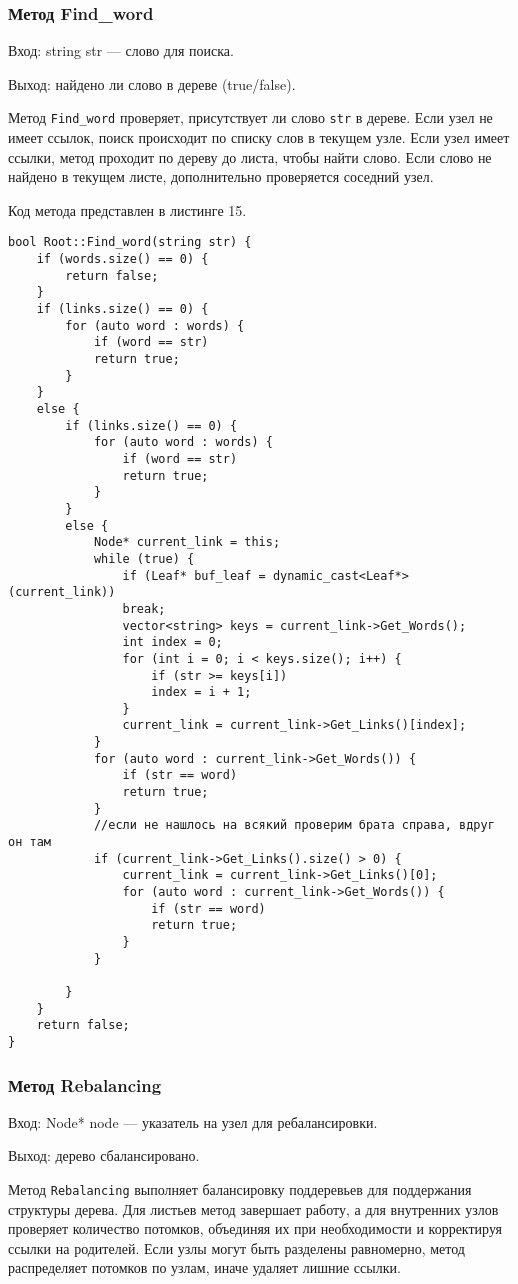 \documentclass[10pt,a4paper,final]{article} %
\begin{document}
\subsubsection{Метод Find\_word}
Вход: string str — слово для поиска. \par
Выход: найдено ли слово в дереве (true/false). \par
\par Метод \texttt{Find\_word} проверяет, присутствует ли слово \texttt{str} в дереве. Если узел не имеет ссылок, поиск происходит по списку слов в текущем узле. Если узел имеет ссылки, метод проходит по дереву до листа, чтобы найти слово. Если слово не найдено в текущем листе, дополнительно проверяется соседний узел.

Код метода представлен в листинге 15. \begin{lstlisting}[label=findWordMethod, caption = Метод Find\_word] 
bool Root::Find_word(string str) {
	if (words.size() == 0) {
		return false;
	}
	if (links.size() == 0) {
		for (auto word : words) {
			if (word == str)
			return true;
		}
	}
	else {
		if (links.size() == 0) {
			for (auto word : words) {
				if (word == str)
				return true;
			}
		}
		else {
			Node* current_link = this;
			while (true) {
				if (Leaf* buf_leaf = dynamic_cast<Leaf*>(current_link))
				break;
				vector<string> keys = current_link->Get_Words();
				int index = 0;
				for (int i = 0; i < keys.size(); i++) {
					if (str >= keys[i])
					index = i + 1;
				}
				current_link = current_link->Get_Links()[index];
			}
			for (auto word : current_link->Get_Words()) {
				if (str == word)
				return true;
			}
			//если не нашлось на всякий проверим брата справа, вдруг он там
			if (current_link->Get_Links().size() > 0) {
				current_link = current_link->Get_Links()[0];
				for (auto word : current_link->Get_Words()) {
					if (str == word)
					return true;
				}
			}
			
		}
	}
	return false;
}\end{lstlisting}


\subsubsection{Метод Rebalancing}
Вход: Node* node — указатель на узел для ребалансировки. \par
Выход: дерево сбалансировано. \par
\par Метод \texttt{Rebalancing} выполняет балансировку поддеревьев для поддержания структуры дерева. Для листьев метод завершает работу, а для внутренних узлов проверяет количество потомков, объединяя их при необходимости и корректируя ссылки на родителей. Если узлы могут быть разделены равномерно, метод распределяет потомков по узлам, иначе удаляет лишние ссылки.
\end{document}
